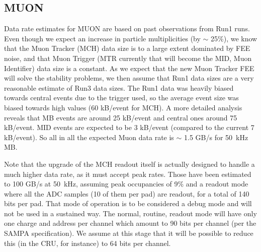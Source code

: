\subsection{MUON}
\label{MUON:datarate}

Data rate estimates for MUON are based on past observations from 
Run1 \pbpb runs. Even though we expect an increase in particle 
multiplicities (by $\sim$ 25\%), we know that the Muon Tracker (MCH) 
data size is to a large extent dominated by FEE noise, and 
that Muon Trigger (MTR currently that will become the MID, 
Muon Identifier) data size is a constant.  
As we expect that the new Muon Tracker FEE will solve the 
stability problems, we then assume that Run1 data 
sizes are a very reasonable estimate of Run3 data sizes. 
The Run1 data was heavily biased towards central events 
due to the trigger used, so the average event size was 
biased towards high values (60 kB/event for MCH). A more 
detailed analysis reveals that MB events are around 
25 kB/event and central ones around 75 kB/event. 
MID events are expected to be 3 kB/event (compared to the 
current 7 kB/event). So all in all the expected Muon data 
rate is $\sim$ 1.5 GB/s for 50~kHz MB.

Note that the upgrade of the MCH readout itself is actually 
designed to handle a much higher data rate\cite{Run3OnlineTDR}, 
as it must accept peak rates. Those have been estimated 
to 100 GB/s at 50~kHz, assuming peak occupancies of 9\% and a 
readout mode where all the ADC samples (10 of them per pad) are 
readout, for a total of 140 bits per pad. That mode of operation is to 
be considered a debug mode and will not be used in a sustained way. 
The normal, routine, readout mode will have only one charge and address 
per channel which amount to 90 bits per channel (per the SAMPA specification). 
We assume at this stage that it will be possible to reduce this (in the CRU, for instance) 
to 64 bits per channel.
